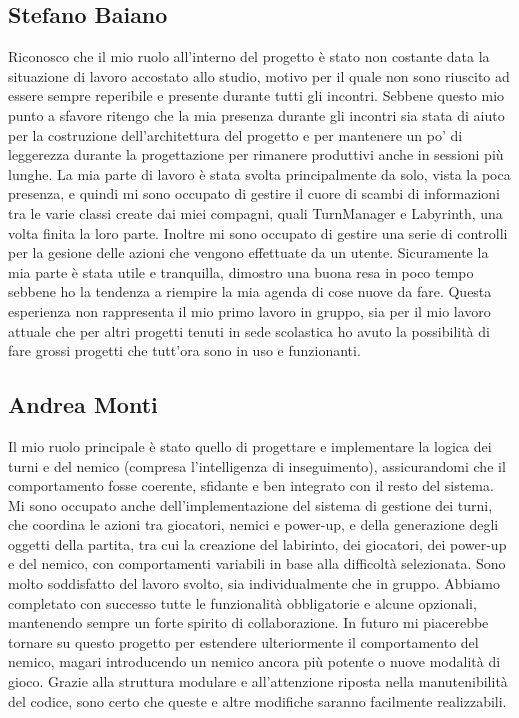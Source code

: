 \documentclass[a4paper,12pt]{report}
\begin{document}
\subsection{Stefano Baiano}
Riconosco che il mio ruolo all'interno del progetto è stato non costante data la situazione di lavoro accostato allo studio, motivo per il quale non sono riuscito 
ad essere sempre reperibile e presente durante tutti gli incontri. Sebbene questo mio punto a sfavore ritengo che la mia presenza durante gli incontri sia stata di 
aiuto per la costruzione dell'architettura del progetto e per mantenere un po' di leggerezza durante la progettazione per rimanere produttivi anche in sessioni più lunghe. 
La mia parte di lavoro è stata svolta principalmente da solo, vista la poca presenza, e quindi mi sono occupato di gestire il cuore di scambi di informazioni tra le varie classi 
create dai miei compagni, quali TurnManager e Labyrinth, una volta finita la loro parte. Inoltre mi sono occupato di gestire una serie di controlli per la gesione delle 
azioni che vengono effettuate da un utente. Sicuramente la mia parte è stata utile e tranquilla, dimostro una buona resa in poco tempo sebbene ho la tendenza a riempire 
la mia agenda di cose nuove da fare. Questa esperienza non rappresenta il mio primo lavoro in gruppo, sia per il mio lavoro attuale che per altri progetti tenuti in sede scolastica 
ho avuto la possibilità di fare grossi progetti che tutt'ora sono in uso e funzionanti.

\subsection{Andrea Monti}
Il mio ruolo principale è stato quello di progettare e implementare la logica dei turni e del nemico (compresa 
l’intelligenza di inseguimento), assicurandomi che il comportamento fosse coerente, sfidante e ben integrato con il 
resto del sistema. Mi sono occupato anche dell’implementazione del sistema di gestione dei turni, che coordina le azioni 
tra giocatori, nemici e power-up, e della generazione degli oggetti della partita, tra cui la creazione del labirinto, dei 
giocatori, dei power-up e del nemico, con comportamenti variabili in base alla difficoltà selezionata.
Sono molto soddisfatto del lavoro svolto, sia individualmente che in gruppo. Abbiamo completato con successo tutte le 
funzionalità obbligatorie e alcune opzionali, mantenendo sempre un forte spirito di collaborazione.
In futuro mi piacerebbe tornare su questo progetto per estendere ulteriormente il comportamento del nemico, 
magari introducendo un nemico ancora più potente o nuove modalità di gioco. Grazie alla struttura modulare e all’attenzione 
riposta nella manutenibilità del codice, sono certo che queste e altre modifiche saranno facilmente realizzabili.
\\
\\
\appendix
\end{document}
